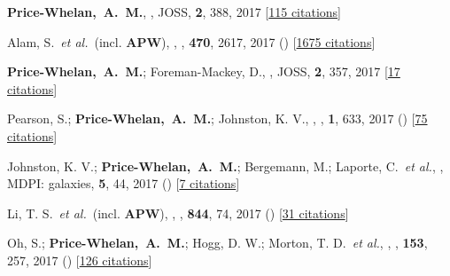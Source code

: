 \item[{\color{deemph}\scriptsize32}]\textbf{Price-Whelan,~A.~M.}, , JOSS, \textbf{2}, 388, 2017 [\href{http://adsabs.harvard.edu/abs/2017JOSS....2..388P}{115 citations}]

\item[{\color{deemph}\scriptsize31}]Alam, S.~\textit{et al.}~(incl. \textbf{APW}), , \mnras, \textbf{470}, 2617, 2017 () [\href{http://adsabs.harvard.edu/abs/2017MNRAS.470.2617A}{1675 citations}]

\item[{\color{deemph}\scriptsize30}]\textbf{Price-Whelan,~A.~M.}; Foreman-Mackey, D., , JOSS, \textbf{2}, 357, 2017 [\href{http://adsabs.harvard.edu/abs/2017JOSS....2..357P}{17 citations}]

\item[{\color{deemph}\scriptsize29}]Pearson, S.; \textbf{Price-Whelan,~A.~M.}; Johnston, K. V., , \natureast, \textbf{1}, 633, 2017 () [\href{http://adsabs.harvard.edu/abs/2017NatAs...1..633P}{75 citations}]

\item[{\color{deemph}\scriptsize28}]Johnston, K. V.; \textbf{Price-Whelan,~A.~M.}; Bergemann, M.; Laporte, C.~\textit{et al.}, , MDPI: galaxies, \textbf{5}, 44, 2017 () [\href{http://adsabs.harvard.edu/abs/2017Galax...5...44J}{7 citations}]

\item[{\color{deemph}\scriptsize27}]Li, T. S.~\textit{et al.}~(incl. \textbf{APW}), , \apj, \textbf{844}, 74, 2017 () [\href{http://adsabs.harvard.edu/abs/2017ApJ...844...74L}{31 citations}]

\item[{\color{deemph}\scriptsize26}]Oh, S.; \textbf{Price-Whelan,~A.~M.}; Hogg, D. W.; Morton, T. D.~\textit{et al.}, , \aj, \textbf{153}, 257, 2017 () [\href{http://adsabs.harvard.edu/abs/2017AJ....153..257O}{126 citations}]

